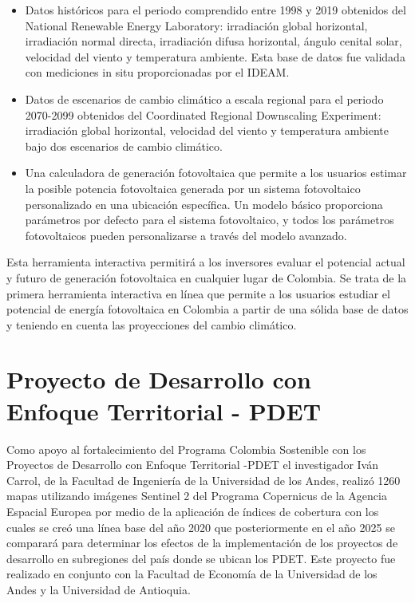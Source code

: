 \begin{itemize}
    \item Datos históricos para el periodo comprendido entre 1998 y 2019 obtenidos del National Renewable Energy Laboratory: irradiación global horizontal, 
irradiación normal directa, irradiación difusa horizontal, ángulo cenital solar, velocidad del viento y temperatura ambiente. Esta base de datos fue validada 
con mediciones in situ proporcionadas por el IDEAM.
    \item Datos de escenarios de cambio climático a escala regional para el periodo 2070-2099 obtenidos del Coordinated Regional Downscaling Experiment: 
irradiación global horizontal, velocidad del viento y temperatura ambiente bajo dos escenarios de cambio climático.
    \item Una calculadora de generación fotovoltaica que permite a los usuarios estimar la posible potencia fotovoltaica generada por un sistema fotovoltaico 
personalizado en una ubicación específica. Un modelo básico proporciona parámetros por defecto para el sistema fotovoltaico, y todos los parámetros 
fotovoltaicos pueden personalizarse a través del modelo avanzado.
\end{itemize}

Esta herramienta interactiva permitirá a los inversores evaluar el potencial actual y futuro de generación fotovoltaica en cualquier lugar de Colombia. Se trata 
de la primera herramienta interactiva en línea que permite a los usuarios estudiar el potencial de energía fotovoltaica en Colombia a partir de una sólida base 
de datos y teniendo en cuenta las proyecciones del cambio climático.

\section{Proyecto de Desarrollo con Enfoque Territorial - PDET}
Como apoyo al fortalecimiento del Programa Colombia Sostenible con los Proyectos de Desarrollo con Enfoque Territorial -PDET el investigador Iván Carrol, de la 
Facultad de Ingeniería de la Universidad de los Andes, realizó 1260 mapas utilizando imágenes Sentinel 2 del Programa Copernicus de la Agencia Espacial Europea 
por medio de la aplicación de índices de cobertura con los cuales se creó una línea base del año 2020 que posteriormente en el año 2025 se comparará para 
determinar los efectos de la implementación de los proyectos de desarrollo en subregiones del país donde se ubican los PDET. Este proyecto fue realizado en 
conjunto con la Facultad de Economía de la Universidad de los Andes y la Universidad de Antioquia.

